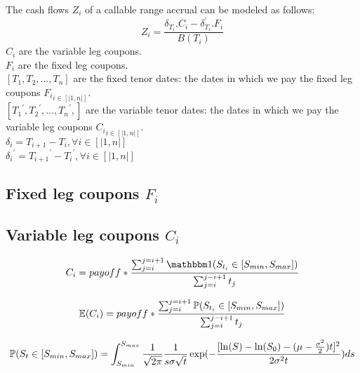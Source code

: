 \documentclass[12pt]{article}
\begin{document}
				The cash flows $Z_{i}$ of a callable range accrual can be modeled as follows:
				\begin{equation}
					Z_i=\frac{\delta_{T_i} . C_i -\delta_{T_i}^{'} . F_i}{B(T_i)}
				\end{equation}
				$C_{i}$ are the variable leg coupons.\\
				$F_{i}$ are the fixed leg coupons.\\
				$[T_{1}, T_{2},..., T_{n}]$ are the fixed tenor dates: the dates in which we pay the fixed leg coupons ${F_{i}}_{i \in [|1,n|]}$.\\
				$[{T_{1}}^{'}, {T_{2}}^{'},..., {T_{n}}^{'},]$ are the variable tenor dates: the dates in which we pay the variable leg coupons ${C_{i}}_{i \in [|1,n|]}$.\\
				${\delta}_{i} = T_{i+1} - T_{i},  \forall i \in [|1,n|]$\\
				${{\delta}_{i}}^{'} = {T_{i+1}}^{'} - {T_{i}}^{'},  \forall i \in [|1,n|]$\\

				\subsection{Fixed leg coupons $F_{i}$}
				\subsection{Variable leg coupons $C_{i}$}
					\begin{equation*}
						C_i=payoff * \frac{\sum_{j=i}^{j=i+1}\indicator (S_{t_i} \in [S_{min},S_{max}])}{\sum_{j=i}^{j-i+1}t_j}
					\end{equation*}
					
					\begin{equation*}
					\mathbb{E}(C_i)=payoff * \frac{\sum_{j=i}^{j=i+1} \mathbb{P} (S_{t_i} \in [S_{min},S_{max}])}{\sum_{j=i}^{j-i+1}t_j}
					\end{equation*}
					
					\begin{equation}
						\mathbb{P}(S_t \in [S_{min},S_{max}]) = \int_{S_{min}}^{S_{max}} \frac{1}{\sqrt{2 \pi}} \frac{1}{s\sigma \sqrt{t}} \exp(-\frac{[\ln(S)-\ln(S_0)-
							(\mu-\frac{\sigma^2}{2})t]^2}{2 \sigma ^{2}t}) ds
					\end{equation}
					
\end{document}
